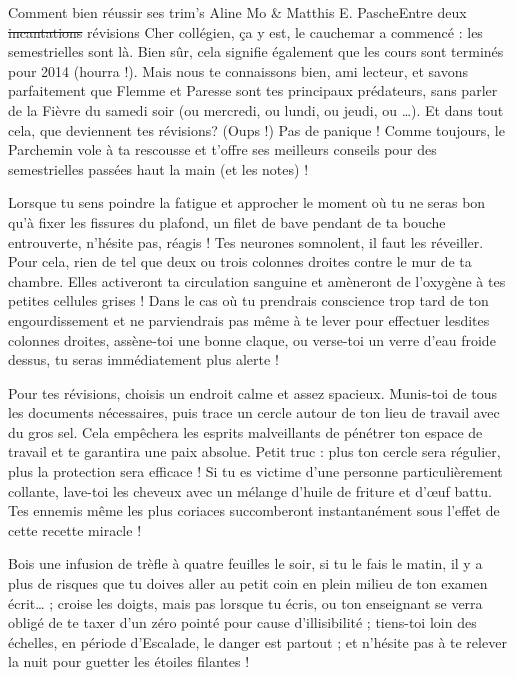 \newpage
\vspace*{-2.8cm}
\begin{spacing}{.94}
\begin{article}{Comment bien réussir ses trim's}
{Aline Mo \& Matthis E. Pasche}{Entre deux \st{incantations} révisions}
Cher collégien, ça y est, le cauchemar a commencé : les semestrielles sont là. Bien sûr, cela signifie également que les cours sont terminés pour 2014 (hourra !). Mais nous te connaissons bien, ami lecteur, et savons parfaitement que Flemme et Paresse sont tes principaux prédateurs, sans parler de la Fièvre du samedi soir (ou mercredi, ou lundi, ou jeudi, ou …). Et dans tout cela, que deviennent tes révisions? (Oups !)
Pas de panique ! Comme toujours, le Parchemin vole à ta rescousse et t'offre ses meilleurs conseils pour des semestrielles passées haut la main (et les notes) !

Lorsque tu sens poindre la fatigue et approcher le moment où tu ne seras bon qu'à fixer les fissures du plafond, un filet de bave pendant de ta bouche entrouverte, n'hésite pas, réagis ! Tes neurones somnolent, il faut les réveiller. Pour cela, rien de tel que deux ou trois colonnes droites contre le mur de ta chambre. Elles activeront ta circulation sanguine et amèneront de l'oxygène à tes petites cellules grises !
Dans le cas où tu prendrais conscience trop tard de ton engourdissement et ne parviendrais pas même à te lever pour effectuer lesdites colonnes droites, assène-toi une bonne claque, ou verse-toi un verre d'eau froide dessus, tu seras immédiatement plus alerte !

Pour tes révisions, choisis un endroit calme et assez spacieux. Munis-toi de tous les documents nécessaires, puis trace un cercle autour de ton lieu de travail avec du gros sel. Cela empêchera les esprits malveillants de pénétrer ton espace de travail et te garantira une paix absolue. Petit truc : plus ton cercle sera régulier, plus la protection sera efficace !
Si tu es victime d'une personne particulièrement collante, lave-toi les cheveux avec un mélange d'huile de friture et d'œuf battu. Tes ennemis même les plus coriaces succomberont instantanément sous l'effet de cette recette miracle !

Bois une infusion de trèfle à quatre feuilles le soir, si tu le fais le matin, il y a plus de risques que tu doives aller au petit coin en plein milieu de ton examen écrit… ; croise les doigts, mais pas lorsque tu écris, ou ton enseignant se verra obligé de te taxer d'un zéro pointé pour cause d'illisibilité ; tiens-toi loin des échelles, en période d'Escalade, le danger est partout ; et n'hésite pas à te relever la nuit pour guetter les étoiles filantes !


\end{article}
\end{spacing}
